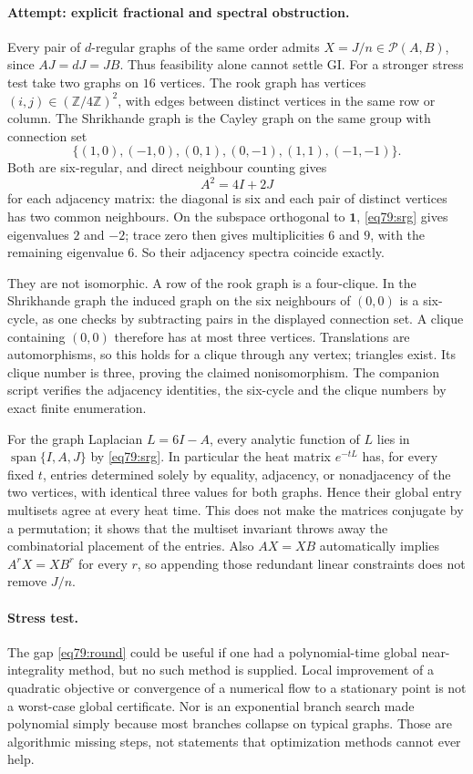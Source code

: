 \documentclass[11pt,a4paper]{article}
\numberwithin{equation}{section}
\newcommand{\Z}{\mathbb{Z}}
\begin{document}
\paragraph{Attempt: explicit fractional and spectral obstruction.}
Every pair of $d$-regular graphs of the same order admits
$X=J/n\in\mathcal P(A,B)$, since $AJ=dJ=JB$. Thus feasibility alone
cannot settle GI. For a stronger stress test take two graphs on $16$
vertices. The rook graph has vertices $(i,j)\in(\Z/4\Z)^2$, with edges
between distinct vertices in the same row or column. The Shrikhande graph
is the Cayley graph on the same group with connection set
\[
 \{(1,0),(-1,0),(0,1),(0,-1),(1,1),(-1,-1)\}.
\]
Both are six-regular, and direct neighbour counting gives
\begin{equation}\label{eq79:srg}
 A^2=4I+2J
\end{equation}
for each adjacency matrix: the diagonal is six and each pair of distinct
vertices has two common neighbours. On the subspace orthogonal to
$\mathbf1$, \eqref{eq79:srg} gives eigenvalues $2$ and $-2$; trace zero
then gives multiplicities $6$ and $9$, with the remaining eigenvalue $6$.
So their adjacency spectra coincide exactly.

They are not isomorphic. A row of the rook graph is a four-clique. In the
Shrikhande graph the induced graph on the six neighbours of $(0,0)$ is a
six-cycle, as one checks by subtracting pairs in the displayed connection
set. A clique containing $(0,0)$ therefore has at most three vertices.
Translations are automorphisms, so this holds for a clique through any
vertex; triangles exist. Its clique number is three, proving the claimed
nonisomorphism. The companion script verifies the adjacency identities,
the six-cycle and the clique numbers by exact finite enumeration.

For the graph Laplacian $L=6I-A$, every analytic function of $L$ lies in
$\operatorname{span}\{I,A,J\}$ by \eqref{eq79:srg}. In particular the
heat matrix $e^{-tL}$ has, for every fixed $t$, entries determined solely
by equality, adjacency, or nonadjacency of the two vertices, with identical
three values for both graphs. Hence their global entry multisets agree at
every heat time. This does not make the matrices conjugate by a permutation;
it shows that the multiset invariant throws away the combinatorial
placement of the entries. Also $AX=XB$ automatically implies
$A^rX=XB^r$ for every $r$, so appending those redundant linear constraints
does not remove $J/n$.

\paragraph{Stress test.}
The gap \eqref{eq79:round} could be useful if one had a polynomial-time
global near-integrality method, but no such method is supplied. Local
improvement of a quadratic objective or convergence of a numerical flow
to a stationary point is not a worst-case global certificate. Nor is an
exponential branch search made polynomial simply because most branches
collapse on typical graphs. Those are algorithmic missing steps, not
statements that optimization methods cannot ever help.
\end{document}

